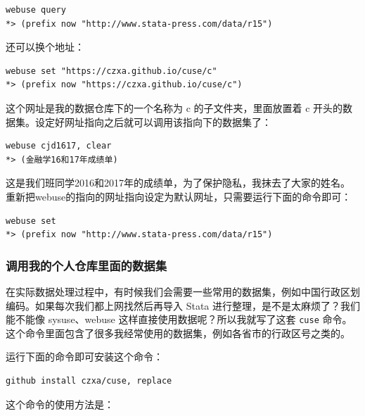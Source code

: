 \begin{lstlisting}
webuse query
*> (prefix now "http://www.stata-press.com/data/r15")
\end{lstlisting}

还可以换个地址：

\begin{lstlisting}
webuse set "https://czxa.github.io/cuse/c"
*> (prefix now "https://czxa.github.io/cuse/c")
\end{lstlisting}

这个网址是我的数据仓库下的一个名称为 c 的子文件夹，里面放置着 c 开头的数据集。设定好网址指向之后就可以调用该指向下的数据集了：

\begin{lstlisting}
webuse cjd1617, clear
*> (金融学16和17年成绩单)
\end{lstlisting}

这是我们班同学2016和2017年的成绩单，为了保护隐私，我抹去了大家的姓名。
重新把webuse的指向的网址指向设定为默认网址，只需要运行下面的命令即可：

\begin{lstlisting}
webuse set
*> (prefix now "http://www.stata-press.com/data/r15")
\end{lstlisting}

\subsubsection{调用我的个人仓库里面的数据集}
在实际数据处理过程中，有时候我们会需要一些常用的数据集，例如中国行政区划编码。如果每次我们都上网找然后再导入 Stata 进行整理，是不是太麻烦了？我们能不能像 sysuse、webuse 这样直接使用数据呢？所以我就写了这套 \lstinline{cuse} 命令。这个命令里面包含了很多我经常使用的数据集，例如各省市的行政区号之类的。

运行下面的命令即可安装这个命令：

\begin{lstlisting}
github install czxa/cuse, replace
\end{lstlisting}

这个命令的使用方法是：

